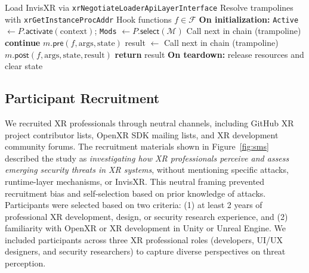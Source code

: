 \documentclass[letterpaper,twocolumn,10pt]{article}
\begin{document}
\begin{algorithm}[!t] \footnotesize
\caption{Runtime hijacking via InvisXR}
\label{alg:invisxr_generic}
\DontPrintSemicolon
{}

\begin{algorithmic}[1]
\STATE Load InvisXR via \texttt{xrNegotiateLoaderApiLayerInterface}
\STATE Resolve trampolines with \texttt{xrGetInstanceProcAddr} 
\STATE Hook functions $f \in \mathcal{F}$  
\STATE \textbf{On initialization:} \texttt{Active} $\gets P.\textsf{activate}(\text{context})$; \quad \texttt{Mods} $\gets P.\textsf{select}(\mathcal{M})$  
        \STATE Call next in chain (trampoline)  
        \STATE \textbf{continue}
    \ENDIF
        \STATE $m.\textsf{pre}(f, \text{args}, \text{state})$  
    \ENDFOR
    \STATE result $\gets$ Call next in chain (trampoline)  
        \STATE $m.\textsf{post}(f, \text{args}, \text{state}, \text{result})$ 
    \ENDFOR
    \STATE \textbf{return} result  
\ENDFOR
\STATE \textbf{On teardown:} release resources and clear state  
\end{algorithmic}
\end{algorithm}


\subsection{Participant Recruitment} 
\label{sec:participantrecruitment}
We recruited XR professionals through neutral channels, including GitHub XR project contributor lists, OpenXR SDK mailing lists, and XR development community forums. The recruitment materials shown in Figure~\ref{fig:sms} described the study as \textit{investigating how XR professionals perceive and assess emerging security threats in XR systems}, without mentioning specific attacks, runtime-layer mechanisms, or InvisXR. This neutral framing prevented recruitment bias and self-selection based on prior knowledge of attacks. Participants were selected based on two criteria: (1) at least 2 years of professional XR development, design, or security research experience, and (2) familiarity with OpenXR or XR development in Unity or Unreal Engine. We included participants across three XR professional roles (developers, UI/UX designers, and security researchers) to capture diverse perspectives on threat perception.
\end{document}
